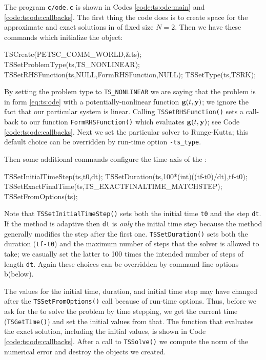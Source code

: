 The program \texttt{c/\CODELOC ode.c} is shown in Codes \ref{code:ts:ode:main} and \ref{code:ts:ode:callbacks}.  The first thing the code does is to create space for the approximate and exact solutions in \pVecs of fixed size $N=2$.  Then we have these commands which initialize the \pTS object:
\begin{code}
  TSCreate(PETSC_COMM_WORLD,&ts);
  TSSetProblemType(ts,TS_NONLINEAR);
  TSSetRHSFunction(ts,NULL,FormRHSFunction,NULL);
  TSSetType(ts,TSRK);
\end{code}
By setting the problem type to \texttt{TS\_NONLINEAR} we are saying that the problem is in form \eqref{eq:ts:ode} with a potentially-nonlinear function $\mathbf{g}(t,\mathbf{y})$; we ignore the fact that our particular system is linear.  Calling \texttt{TSSetRHSFunction()} sets a call-back to our function \texttt{FormRHSFunction()} which evaluates $\mathbf{g}(t,\mathbf{y})$; see Code \ref{code:ts:ode:callbacks}.  Next we set the particular \pTS solver to Runge-Kutta; this default choice can be overridden by run-time option \texttt{-ts\_type}.

Then some additional commands configure the time-axis of the \pTS:
\begin{code}
  TSSetInitialTimeStep(ts,t0,dt);
  TSSetDuration(ts,100*(int)((tf-t0)/dt),tf-t0);
  TSSetExactFinalTime(ts,TS_EXACTFINALTIME_MATCHSTEP);
  TSSetFromOptions(ts);
\end{code}
Note that \texttt{TSSetInitialTimeStep()} sets both the initial time \texttt{t0} and the step \texttt{dt}.  If the method is adaptive then \texttt{dt} is \emph{only} the initial time step because the method generally modifies the step after the first one.  \texttt{TSSetDuration()} sets both the duration (\texttt{tf-t0}) and the maximum number of steps that the solver is allowed to take; we casually set the latter to 100 times the intended number of steps of length \texttt{dt}.  Again these choices can be overridden by command-line options b(below).


The values for the initial time, duration, and initial time step may have changed after the \texttt{TSSetFromOptions()} call because of run-time options.  Thus, before we ask for the \pTS to solve the problem by time stepping, we get the current time (\texttt{TSGetTime()}) and set the initial values from that.  The function that evaluates the exact solution, including the initial values, is shown in Code \ref{code:ts:ode:callbacks}.  After a call to \texttt{TSSolve()} we compute the norm of the numerical error and destroy the objects we created.

